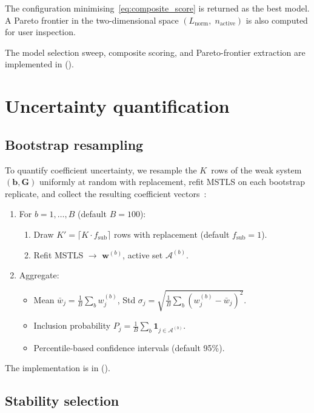 \documentclass{report}
\theoremstyle{plain}
\theoremstyle{remark}
\numberwithin{equation}{section}              %
\begin{document}
The configuration minimising~\eqref{eq:composite_score} is returned as the
best model.  A Pareto frontier in the two-dimensional space
$(L_{\mathrm{norm}},\;n_{\mathrm{active}})$ is also computed for
user inspection.

The model selection sweep, composite scoring, and Pareto-frontier
extraction are implemented in 
().

%
\section{Uncertainty quantification}
\label{sec:uq}

\subsection{Bootstrap resampling}
\label{subsec:bootstrap}

To quantify coefficient uncertainty, we resample the $K$~rows of the weak
system $(\mathbf{b},\mathbf{G})$ uniformly at random with replacement,
refit MSTLS on each bootstrap replicate, and collect the resulting
coefficient vectors~\cite{messenger2021wsindy}:

\begin{enumerate}[nosep]
\item For $b=1,\dots,B$ (default $B=100$):
  \begin{enumerate}[nosep]
  \item Draw $K'=\lceil K\cdot f_{\mathrm{sub}}\rceil$ rows with
        replacement (default $f_{\mathrm{sub}}=1$).
  \item Refit MSTLS $\to$ $\mathbf{w}^{(b)}$, active set $\mathcal{A}^{(b)}$.
  \end{enumerate}
\item Aggregate:
  \begin{itemize}[nosep]
  \item Mean $\bar{w}_j = \frac{1}{B}\sum_b w_j^{(b)}$,\;
        Std $\sigma_j = \sqrt{\frac{1}{B}\sum_b(w_j^{(b)}-\bar{w}_j)^2}$.
  \item Inclusion probability
        $P_j = \frac{1}{B}\sum_b\mathbf{1}_{j\in\mathcal{A}^{(b)}}$.
  \item Percentile-based confidence intervals (default 95\%).
  \end{itemize}
\end{enumerate}
The implementation is in 
().

\subsection{Stability selection}
\label{subsec:stability}
\end{document}
